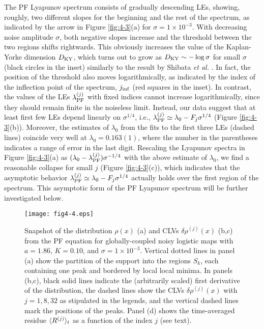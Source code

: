 \documentclass[12pt]{iopart}
\begin{document}
The PF Lyapunov spectrum consists of gradually descending LEs,
 showing, roughly, two different slopes for the beginning and the rest
 of the spectrum, as indicated by the arrow in Figure \ref{fig:4-3}(a)
 for $\sigma = 1 \times 10^{-3}$.
With decreasing noise amplitude $\sigma$,
 both negative slopes increase
 and the threshold between the two regions shifts rightwards.
This obviously increases the value of the Kaplan-Yorke dimension $D_{\rm KY}$,
 which turns out to grow as $D_{\rm KY} \sim -\log\sigma$ for small $\sigma$
 (black circles in the inset)
 similarly to the result by Shibata \textit{et al.}
 \cite{Shibata.etal-PRL1999}.
In fact, the position of the threshold also moves logarithmically,
 as indicated by the index of the inflection point of the spectrum,
 $j_{\rm inf}$ (red squares in the inset).
In contrast, the values of the LEs $\lambda_{\rm PF}^{(j)}$
 with fixed indices cannot increase logarithmically,
 since they should remain finite in the noiseless limit.
Instead, our data suggest that at least first few LEs
 depend linearly on $\sigma^{1/4}$,
 i.e., $\lambda_{\rm PF}^{(j)} \simeq \lambda_0 - F_j \sigma^{1/4}$
 (Figure \ref{fig:4-3}(b)).
Moreover, the estimates of $\lambda_0$ from the fits to the first three LEs
 (dashed lines)
 coincide very well at $\lambda_0 = 0.163(1)$,
 where the number in the parentheses
 indicates a range of error in the last digit.
Rescaling the Lyapunov spectra in Figure \ref{fig:4-3}(a)
 as $(\lambda_0 - \lambda_{\rm PF}^{(j)}) \sigma^{-1/4}$
 with the above estimate of $\lambda_0$,
 we find a reasonable collapse for small $j$ (Figure \ref{fig:4-3}(c)),
 which indicates that the asymptotic behavior
 $\lambda_{\rm PF}^{(j)} \simeq \lambda_0 - F_j \sigma^{1/4}$
 actually holds over the first region of the spectrum.
This asymptotic form of the PF Lyapunov spectrum will be
 further investigated below.

\begin{figure}[t]
 \begin{center}
  \texttt{[image: fig4-4.eps]}
  \caption{Snapshot of the distribution $\rho(x)$ (a) and CLVs $\delta\rho^{(j)}(x)$ (b,c) from the PF equation for globally-coupled noisy logistic maps  with $a=1.86$, $K=0.10$, and $\sigma = 1 \times 10^{-3}$. Vertical dotted lines in panel (a) show the partition of the support into the regions $S_k$, each containing one peak and bordered by local local minima. In panels (b,c), black solid lines indicate the (arbitrarily scaled) first derivative of the distribution, the dashed lines show the CLVs $\delta\rho^{(j)}(x)$ with $j=1, 8, 32$ as stipulated in the legends, and the vertical dashed lines mark the positions of the peaks. Panel (d) shows the time-averaged residue $\langle R^{(j)} \rangle_t$ as a function of the index $j$ (see text).}
  \label{fig:4-4}
 \end{center}
\end{figure}%
\end{document}
